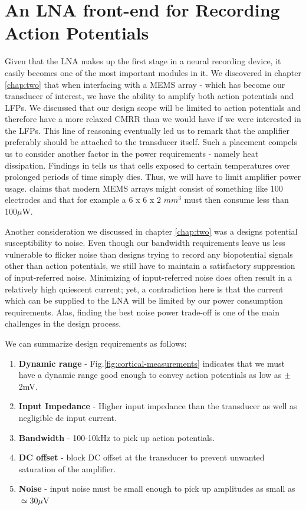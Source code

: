 \chapter{An LNA front-end for Recording Action Potentials}
Given that the \acl{LNA} makes up the first stage in a neural recording device, it easily becomes one of the most important modules in it. 
We discovered in chapter \ref{chap:two} that when interfacing with a \acs{MEMS} array - which has become our transducer of interest, we have the ability to amplify both action potentials and \acs{LFP}s. 
We discussed that our design scope will be limited to action potentials and therefore have a more relaxed CMRR than we would have if we were interested in the LFPs. This line of reasoning eventually 
led us to remark that the amplifier preferably should be attached to the transducer itself. Such a placement compels us to consider another factor in the power requirements - namely heat dissipation. Findings in 
\cite{seese1998characterization} tells us that cells exposed to certain temperatures over prolonged periods of time simply dies. Thus, we will have to limit amplifier power usage. 
\cite{harrison2008design} claims that modern \acs{MEMS} arrays might consist of something like 100 electrodes and that for example a 6 x 6 x 2 $mm^3$ must then consume less than 100$\mu$W.

Another consideration we discussed in chapter \ref{chap:two} was a designs potential susceptibility to noise. Even though our bandwidth requirements leave us less vulnerable to flicker noise than designs 
trying to record any biopotential signals other than action potentials, we still have to maintain a satisfactory suppression of input-referred noise. Minimizing of input-referred noise does often result in
a relatively high quiescent current; yet, a contradiction here is that the current which can be supplied to the LNA will be limited by our power consumption requirements. Alas, finding the best noise power 
trade-off is one of the main challenges in the design process.

We can summarize design requirements as follows:

\begin{enumerate}
  \item\textbf{Dynamic range} - Fig.\ref{fig:cortical-measurements} indicates that we must have a dynamic range good enough to convey action potentials as low as $\pm$2mV.
  \item\textbf{Input Impedance} - Higher input impedance than the transducer as well as negligible dc input current.
  \item\textbf{Bandwidth} - 100-10kHz to pick up action potentials.
  \item\textbf{DC offset} - block DC offset at the transducer to prevent unwanted saturation of the amplifier.
  \item\textbf{Noise} - input noise must be small enough to pick up amplitudes as small as $\simeq$30$\mu$V
\end{enumerate}


